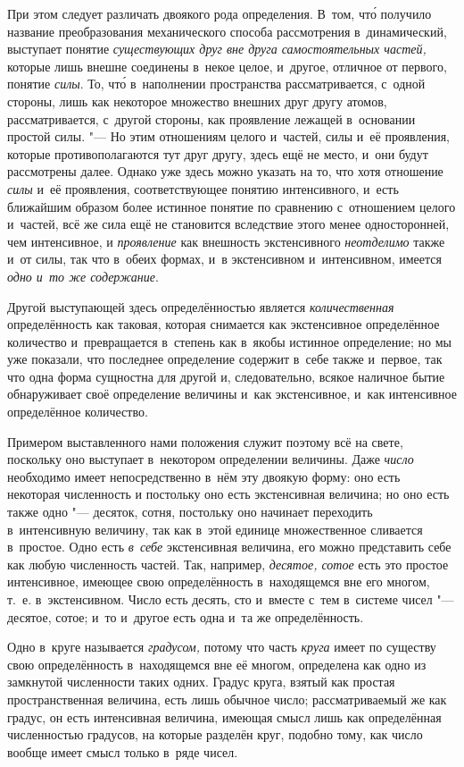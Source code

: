 При этом следует различать двоякого рода определения. В~том, чт\'{о} получило
название преобразования механического способа рассмотрения в~динамический,
выступает понятие {\em существующих друг вне друга самостоятельных частей,}
которые лишь внешне соединены в~некое целое, и~другое, отличное от первого,
понятие {\em силы}. То, чт\'{о} в~наполнении пространства рассматривается,
с~одной стороны, лишь как некоторое множество внешних друг другу атомов,
рассматривается, с~другой стороны, как проявление лежащей в~основании простой
силы. "--- Но этим отношениям целого и~частей, силы и~её проявления, которые
противополагаются тут друг другу, здесь ещё не место, и~они будут рассмотрены
далее. Однако уже здесь можно указать на то, что хотя отношение {\em силы} и~её
проявления, соответствующее понятию интенсивного, и~есть ближайшим образом
более истинное понятие по сравнению с~отношением целого и~частей, всё же сила
ещё не становится вследствие этого менее односторонней, чем интенсивное, и
{\em проявление} как внешность экстенсивного {\em неотделимо} также и~от силы,
так что в~обеих формах, и~в экстенсивном и~интенсивном, имеется
{\em одно и~то же содержание}.

Другой выступающей здесь определённостью является {\em количественная}
определённость как таковая, которая снимается как экстенсивное определённое
количество и~превращается в~степень как в~якобы истинное определение; но мы уже
показали, что последнее определение содержит в~себе также и~первое, так что
одна форма сущностна для другой и, следовательно, всякое наличное бытие
обнаруживает своё определение величины и~как экстенсивное, и~как интенсивное определённое
количество.

Примером выставленного нами положения служит поэтому всё на свете, поскольку
оно выступает в~некотором определении величины. Даже {\em число} необходимо
имеет непосредственно в~нём эту двоякую форму: оно есть некоторая численность и
постольку оно есть экстенсивная величина; но оно есть также одно "--- десяток,
сотня, постольку оно начинает переходить в~интенсивную величину, так как в~этой
единице множественное сливается в~простое. Одно есть {\em в~себе} экстенсивная
величина, его можно представить себе как любую численность частей. Так,
например, {\em десятое, сотое} есть это простое интенсивное, имеющее свою
определённость в~находящемся вне его многом, т.~е. в~экстенсивном. Число есть
десять, сто и~вместе с~тем в~системе чисел "--- десятое, сотое; и~то и~другое
есть одна и~та же определённость.

Одно в~круге называется {\em градусом,} потому что часть {\em круга} имеет по
существу свою определённость в~находящемся вне её многом, определена как одно
из замкнутой численности таких одних. Градус круга, взятый как простая
пространственная величина, есть лишь обычное число; рассматриваемый же как
градус, он есть интенсивная величина, имеющая смысл лишь как определённая
численностью градусов, на которые разделён круг, подобно тому, как число вообще
имеет смысл только в~ряде чисел.

